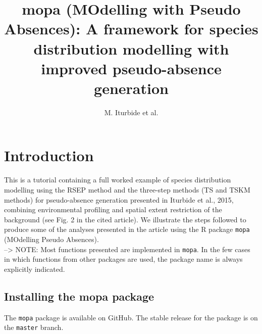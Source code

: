 \documentclass[10pt,a4paper]{article}\usepackage[]{graphicx}\usepackage[]{color}
\begin{document}











\title{mopa (MOdelling with Pseudo Absences): A framework for species distribution modelling with
improved pseudo-absence generation}
\author{M. Iturbide et al.}

\tableofcontents

\maketitle


\section{Introduction}
This is a tutorial containing a full worked example of species distribution modelling using the RSEP method and the three-step methods (TS and TSKM methods) for pseudo-absence generation presented in Iturbide et al., 2015, combining environmental profiling and spatial extent restriction of the background (see Fig. 2 in the cited article). We illustrate the steps followed to produce some of the analyses presented in the article using the R package \texttt{mopa} (MOdelling Pseudo Absences). \\



--> NOTE: Most functions presented are implemented in \texttt{mopa}. In the few cases in which functions from other packages are used, the package name is always explicitly indicated.


\subsection{Installing the mopa package}

The \texttt{mopa} package is available on GitHub. The stable release for the package is on the \texttt{master} branch. 
\end{document}
